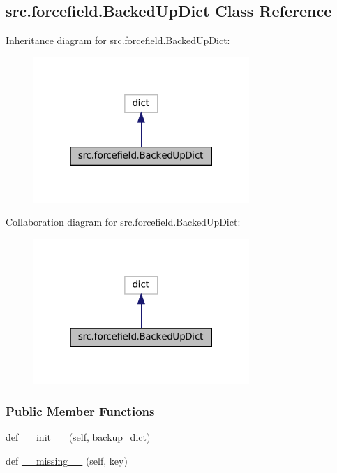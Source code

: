 \hypertarget{classsrc_1_1forcefield_1_1BackedUpDict}{}\subsection{src.\+forcefield.\+Backed\+Up\+Dict Class Reference}
\label{classsrc_1_1forcefield_1_1BackedUpDict}


Inheritance diagram for src.\+forcefield.\+Backed\+Up\+Dict\+:
\nopagebreak
\begin{figure}[H]
\begin{center}
\leavevmode
\includegraphics[width=232pt]{classsrc_1_1forcefield_1_1BackedUpDict__inherit__graph}
\end{center}
\end{figure}


Collaboration diagram for src.\+forcefield.\+Backed\+Up\+Dict\+:
\nopagebreak
\begin{figure}[H]
\begin{center}
\leavevmode
\includegraphics[width=232pt]{classsrc_1_1forcefield_1_1BackedUpDict__coll__graph}
\end{center}
\end{figure}
\subsubsection*{Public Member Functions}
\begin{DoxyCompactItemize}
\item 
def \hyperlink{classsrc_1_1forcefield_1_1BackedUpDict_a6c16265b50936113290b8ce22ed13aef}{\+\_\+\+\_\+init\+\_\+\+\_\+} (self, \hyperlink{classsrc_1_1forcefield_1_1BackedUpDict_addf8540237840c1a5d7f0b3a58002687}{backup\+\_\+dict})
\item 
def \hyperlink{classsrc_1_1forcefield_1_1BackedUpDict_a8f8f5c26fe07656e091ab57c0504121f}{\+\_\+\+\_\+missing\+\_\+\+\_\+} (self, key)
\end{DoxyCompactItemize}
